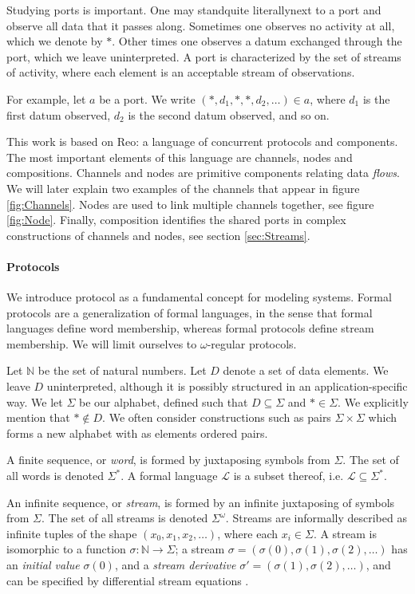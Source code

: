 Studying ports is important.
One may stand\textemdash quite literally\textemdash next to a port and observe all data that it passes along.
Sometimes one observes no activity at all, which we denote by $*$.
Other times one observes a datum exchanged through the port, which we leave uninterpreted.
A port is characterized by the set of streams of activity,
where each element is an acceptable stream of observations.

For example, let $a$ be a port. We write $(*,d_{1},*,*,d_{2},\ldots)\in a$, where $d_{1}$ is the first datum observed, $d_{2}$ is the second datum observed, and so on.

\medskip

This work is based on Reo: a language of concurrent protocols and components.
The most important elements of this language are channels, nodes and compositions.
Channels and nodes are primitive components relating data \emph{flows}.
We will later explain two examples of the channels that appear in figure \ref{fig:Channels}.
Nodes are used to link multiple channels together, see figure \ref{fig:Node}.
Finally, composition identifies the shared ports in complex constructions of channels and nodes,
see section \ref{sec:Streams}.

\paragraph{Protocols}

We introduce protocol as a fundamental concept for modeling systems.
Formal protocols are a generalization of formal languages,
in the sense that formal languages define word membership,
whereas formal protocols define stream membership.
We will limit ourselves to $\omega$-regular protocols.

Let $\mathbb{N}$ be the set of natural numbers.
Let $D$ denote a set of data elements.
We leave $D$ uninterpreted, although it is possibly structured in an application-specific way.
We let $\Sigma$ be our alphabet, defined such that $D\subseteq\Sigma$ and $*\in\Sigma$.
We explicitly mention that $*\not\in D$. We often consider constructions
such as pairs $\Sigma\times\Sigma$ which forms a new alphabet with as elements ordered pairs.

A finite sequence, or \emph{word}, is formed by juxtaposing symbols from $\Sigma$.
The set of all words is denoted $\Sigma^{*}$.
A formal language $\mathcal{L}$ is a subset thereof,
i.e. $\mathcal{L}\subseteq\Sigma^{*}$.

An infinite sequence, or \emph{stream}, is formed by an infinite juxtaposing of symbols from $\Sigma$.
The set of all streams is denoted $\Sigma^{\omega}$.
Streams are informally described as infinite tuples
of the shape $(x_{0},x_{1},x_{2},\ldots)$, where each $x_i \in \Sigma$.
A stream is isomorphic to a function $\sigma:\mathbb{N}\to\Sigma$;
a stream $\sigma = (\sigma(0),\sigma(1),\sigma(2),\ldots)$ has
an \emph{initial value} $\sigma(0)$,
and a \emph{stream derivative} $\sigma' = (\sigma(1),\sigma(2),\ldots)$,
and can be specified by differential stream equations \cite{?}.

